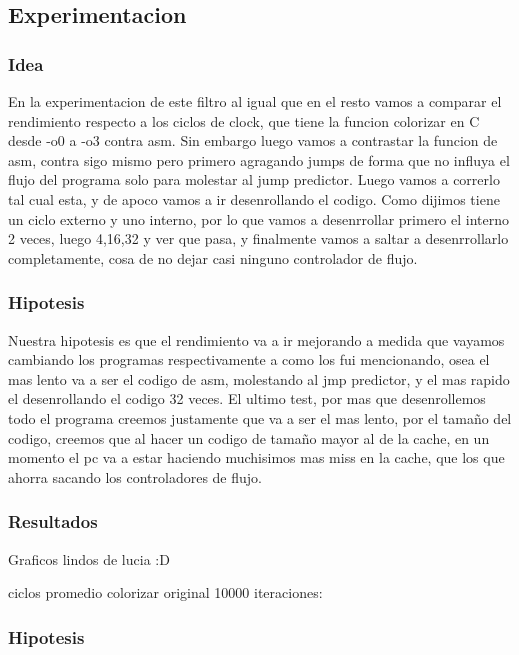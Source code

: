 	
\subsection{Experimentacion}
\subsubsection{Idea}	En la experimentacion de este filtro al igual que en el resto vamos a comparar el rendimiento respecto a los ciclos de clock, que tiene la funcion colorizar en C desde -o0 a -o3 contra asm.
	 Sin embargo luego vamos a contrastar la funcion de asm, contra sigo mismo pero primero agragando jumps de forma que no influya el flujo del programa solo para molestar al jump predictor. Luego vamos a correrlo tal cual esta, y de apoco vamos a ir desenrollando el codigo. Como dijimos tiene un ciclo externo y uno interno, por lo que vamos a desenrrollar primero el interno 2 veces, luego 4,16,32 y ver que pasa, y finalmente vamos a saltar a desenrrollarlo completamente, cosa de no dejar casi ninguno controlador de flujo.
	   
\subsubsection{Hipotesis}
	Nuestra hipotesis es que el rendimiento va a ir mejorando a medida que vayamos cambiando los programas respectivamente a como los fui mencionando, osea el mas lento va a ser el codigo de asm, molestando al jmp predictor, y el mas rapido el desenrollando el codigo 32 veces. El ultimo test, por mas que desenrollemos todo el programa creemos justamente que va a ser el mas lento, por el tamaño del codigo, creemos que al hacer un codigo de tamaño mayor al de la cache, en un momento el pc va a estar haciendo muchisimos mas miss en la cache, que los que ahorra sacando los controladores de flujo.
	
	
\subsubsection{Resultados}
	Graficos lindos de lucia :D
	
	ciclos promedio colorizar original 10000 iteraciones:  	
	
	
	
\subsubsection{Hipotesis}